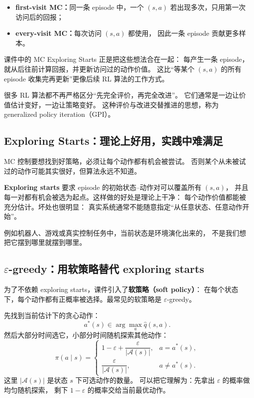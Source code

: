 \documentclass[11pt,a4paper,fontset=fandol]{ctexart}
\newcommand{\Aset}{\mathcal{A}}
\begin{document}
\begin{itemize}
  \item \textbf{first-visit MC：}同一条 episode 中，一个 \((s,a)\)
  若出现多次，只用第一次访问后的回报；
  \item \textbf{every-visit MC：}每次访问 \((s,a)\) 都使用，
  因此一条 episode 贡献更多样本。
\end{itemize}

课件中的 MC Exploring Starts 正是把这些想法合在一起：
每产生一条 episode，就从后往前计算回报，并更新访问过的动作价值。
这比“等某个 \((s,a)\) 的所有 episode 收集完再更新”更像后续 RL 算法的工作方式。

\begin{intuitionbox}[广义策略迭代]
很多 RL 算法都不再严格区分“先完全评价，再完全改进”。
它们通常是一边让价值估计变好，一边让策略变好。
这种评价与改进交替推进的思想，称为 generalized policy iteration（GPI）。
\end{intuitionbox}

\subsection{Exploring Starts：理论上好用，实践中难满足}

MC 控制要想找到好策略，必须让每个动作都有机会被尝试。
否则某个从未被试过的动作可能其实很好，但算法永远不知道。

\textbf{Exploring starts} 要求 episode 的初始状态--动作对可以覆盖所有 \((s,a)\)，
并且每一对都有机会被选为起点。这样做的好处是理论上干净：
每个动作价值都能被充分估计。坏处也很明显：
真实系统通常不能随意指定“从任意状态、任意动作开始”。

例如机器人、游戏或真实控制任务中，当前状态是环境演化出来的，
不是我们想把它摆到哪里就摆到哪里。

\subsection{\texorpdfstring{\(\varepsilon\)-greedy}{epsilon-greedy}：用软策略替代 exploring starts}

为了不依赖 exploring starts，课件引入了\textbf{软策略（soft policy）}：
在每个状态下，每个动作都有正概率被选择。最常见的软策略是
\(\varepsilon\)-greedy。

先找到当前估计下的贪心动作：
\[
a^*(s)\in\arg\max_a \hat q(s,a).
\]
然后大部分时间选它，小部分时间随机探索其他动作：
\[
\boxed{
\pi(a\mid s)=
\begin{cases}
1-\varepsilon+\dfrac{\varepsilon}{|\Aset(s)|},
& a=a^*(s),\\[0.8em]
\dfrac{\varepsilon}{|\Aset(s)|},
& a\neq a^*(s).
\end{cases}
}
\]
这里 \(|\Aset(s)|\) 是状态 \(s\) 下可选动作的数量。
可以把它理解为：先拿出 \(\varepsilon\) 的概率做均匀随机探索，
剩下 \(1-\varepsilon\) 的概率交给当前最优动作。
\end{document}
